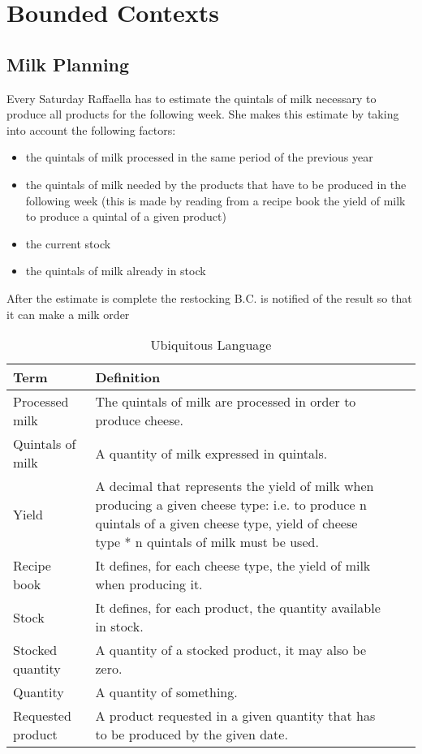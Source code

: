 \chapter{Bounded Contexts}
\section{Milk Planning}
Every Saturday Raffaella has to estimate the quintals of milk necessary to produce all products
for the following week.
She makes this estimate by taking into account the following factors:


\begin{itemize}
    \item the quintals of milk processed in the same period of the previous year
    \item the quintals of milk needed by the products that have to be produced in the following week
    (this is made by reading from a recipe book the yield of milk to produce a quintal of a given product)
    \item the current stock
    \item the quintals of milk already in stock
     
\end{itemize}
  
After the estimate is complete the restocking B.C. is notified of the result so
that it can make a milk order

\begin{table}[H]
    \centering
    \begin{tabular}{p{}*{3}{>{\arraybackslash}p{}}}
    \hline
        Term & Definition \\ \hline
        Processed milk & The quintals of milk are processed in order to produce cheese. \\ \hline
        Quintals of milk & A quantity of milk expressed in quintals. \\ \hline
        Yield & A decimal that represents the yield of milk when producing a given cheese type: i.e. to produce n quintals of a given cheese type, yield of cheese type * n quintals of milk must be used. \\ \hline
        Recipe book & It defines, for each cheese type, the yield of milk when producing it. \\ \hline
        Stock & It defines, for each product, the quantity available in stock. \\ \hline
        Stocked quantity & A quantity of a stocked product, it may also be zero. \\ \hline
        Quantity & A quantity of something. \\ \hline
        Requested product & A product requested in a given quantity that has to be produced by the given date. \\ \hline
    \end{tabular}
    \caption{Ubiquitous Language}
\end{table}

